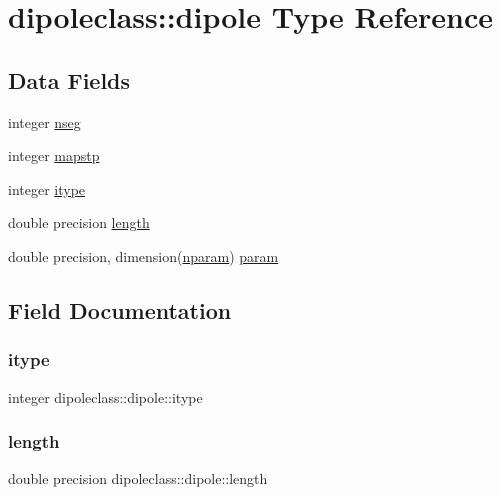 \hypertarget{structdipoleclass_1_1dipole}{}\section{dipoleclass\+::dipole Type Reference}
\label{structdipoleclass_1_1dipole}
\subsection*{Data Fields}
\begin{DoxyCompactItemize}
\item 
integer \mbox{\hyperlink{structdipoleclass_1_1dipole_a5f280e96dab020ba48b5b28f47b0d5fa}{nseg}}
\item 
integer \mbox{\hyperlink{structdipoleclass_1_1dipole_af0a1da636573d6878f6d1c11d0c9e5ab}{mapstp}}
\item 
integer \mbox{\hyperlink{structdipoleclass_1_1dipole_a488890695ad6becc93db5079e740868e}{itype}}
\item 
double precision \mbox{\hyperlink{structdipoleclass_1_1dipole_aada668e2b218b56769c64c2ec9f21dea}{length}}
\item 
double precision, dimension(\mbox{\hyperlink{namespacedipoleclass_abc619199e1e9a2811da9e97630125da3}{nparam}}) \mbox{\hyperlink{structdipoleclass_1_1dipole_a5ce0b668334f66ce50e3852ce17ddc39}{param}}
\end{DoxyCompactItemize}


\subsection{Field Documentation}
\mbox{\label{structdipoleclass_1_1dipole_a488890695ad6becc93db5079e740868e}} 
\subsubsection{\texorpdfstring{itype}{itype}}
{\footnotesize\ttfamily integer dipoleclass\+::dipole\+::itype}

\mbox{\label{structdipoleclass_1_1dipole_aada668e2b218b56769c64c2ec9f21dea}} 
\subsubsection{\texorpdfstring{length}{length}}
{\footnotesize\ttfamily double precision dipoleclass\+::dipole\+::length}

